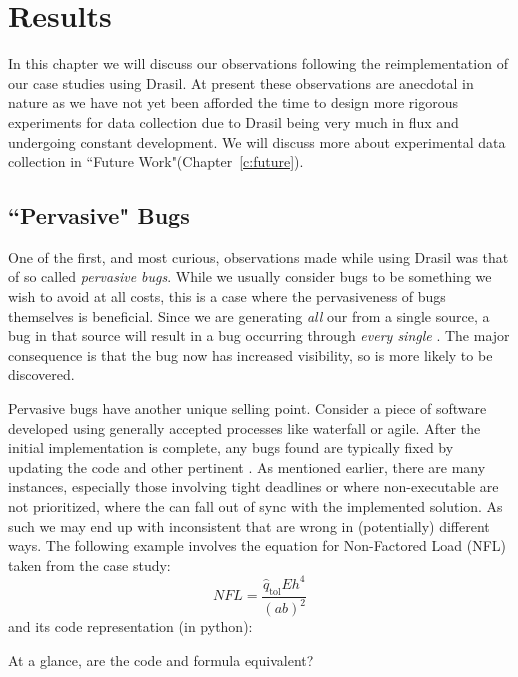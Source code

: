 \chapter{Results}
\label{c:results}

In this chapter we will discuss our observations following the reimplementation 
of our case studies using Drasil. At present these observations are 
anecdotal in nature as we have not yet been afforded the time to design more 
rigorous experiments for data collection due to Drasil being very much in flux 
and undergoing constant development. We will discuss more about experimental 
data collection in ``Future Work"(Chapter~\ref{c:future}).

\section{``Pervasive" Bugs} 

One of the first, and most curious, observations made while using Drasil
was that of so called \emph{pervasive bugs}. While we usually consider bugs to 
be something we wish to avoid at all costs, this is a case where the 
pervasiveness of bugs themselves is beneficial. Since we are generating 
\emph{all} our \sfs{} from a single source, a bug in that source will 
result in a bug occurring through \emph{every single \sf{}}. The major 
consequence is that the bug now has increased visibility, so is more likely to 
be discovered.


Pervasive bugs have another unique selling point. Consider a piece of software 
developed using generally accepted processes like 
waterfall or agile. After the initial implementation is complete, any 
bugs found are typically fixed by updating the code and other pertinent 
\sfs{}. As mentioned earlier, there are many instances, especially those 
involving tight deadlines or where non-executable \sfs{} are not 
prioritized, where the \sfs{} can fall out of sync with the implemented 
solution. As such we may end up with inconsistent \sfs{} that are wrong in 
(potentially) different ways. The following example involves the equation for 
Non-Factored Load (NFL) taken from the \gb{} case study:
\[\mathit{NFL}=\frac{{\hat{q}_{\text{tol}}} E h^{4}}{\left(a b\right)^{2}}\]
and its code representation (in python): 

At a glance, are the code and formula equivalent? 

